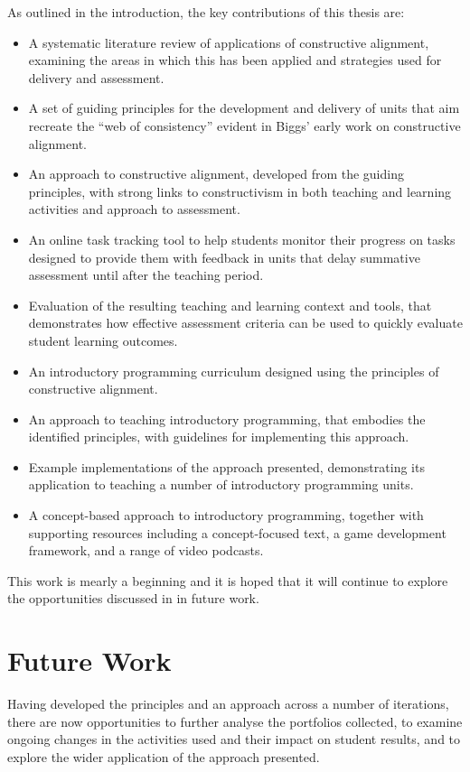 As outlined in the introduction, the key contributions of this thesis are:
\begin{itemize}[noitemsep,nolistsep]
	\item A systematic literature review of applications of constructive alignment, examining the areas in which this has been applied and strategies used for delivery and assessment.
	\item A set of guiding principles for the development and delivery of units that aim recreate the ``web of consistency'' evident in Biggs' early work on constructive alignment. 
	\item An approach to constructive alignment, developed from the guiding principles, with strong links to constructivism in both teaching and learning activities and approach to assessment.
	\item An online task tracking tool to help students monitor their progress on tasks designed to provide them with feedback in units that delay summative assessment until after the teaching period.
	\item Evaluation of the resulting teaching and learning context and tools, that demonstrates how effective assessment criteria can be used to quickly evaluate student learning outcomes.
	\item An introductory programming curriculum designed using the principles of constructive alignment.
	\item An approach to teaching introductory programming, that embodies the identified principles, with guidelines for implementing this approach.
	\item Example implementations of the approach presented, demonstrating its application to teaching a number of introductory programming units.
	\item A concept-based approach to introductory programming, together with supporting resources including a concept-focused text, a game development framework, and a range of video podcasts.
\end{itemize}

This work is mearly a beginning and it is hoped that it will continue to explore the opportunities discussed in  in future work.

\section{Future Work} %
\label{sec:future_work}

Having developed the principles and an approach across a number of iterations, there are now opportunities to further analyse the portfolios collected, to examine ongoing changes in the activities used and their impact on student results, and to explore the wider application of the approach presented.


